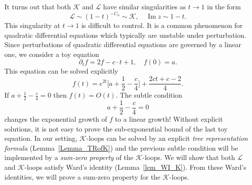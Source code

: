 \documentclass[10pt,reqno]{article}
\DeclareMathOperator{\im}{{\mathrm{Im}}}
\theoremstyle{plain} %
\theoremstyle{remark}
\numberwithin{equation}{section}
\begin{document}
It turns out  that both $\mathcal K$ and $\mathcal L$ have similar singularities as $t \to 1$ in the form 
\[
\mathcal{L}  \sim 
\left( 1-t \right)^{-C_n} \sim {\mathcal K },    \quad \im z \sim 1-t.
\]
This singularity  at $t \to 1$ is  difficult to control.  It  is a common phenomenon for  quadratic differential equations which  typically  are  unstable under perturbation. Since perturbations of  quadratic differential equations are governed by a linear one, we consider a toy  equation
\[
\partial_t f = 2f - c \cdot t + 1, \quad f(0) = a.
\]
This equation can be solved  explicitly 
\[
f(t)= e^{2 t} \big [a  + \frac 1 2    - \frac c 4    \big ] + \frac  { 2 ct + c-2}  4.
\]
If $a  + \frac 1 2    -  \frac c 4   =0$  then \( f(t) = O(t) \).  The subtle condition 
\[
a  + \frac 1 2    -  \frac c 4   =0
\]
changes the exponential growth of $f$ to a linear growth!  Without explicit solutions, it is not easy to prove the sub-exponential bound of the last toy equation. In our setting,   \(\mathcal{K}\)-loops can be solved by an explicit  \emph{tree representation  formula} (Lemma~\ref{Lemma_TRofK}) and  the previous subtle condition will be implemented by a \emph{sum-zero property} of the \(\mathcal{K}\)-loops.   We will show that both \(\mathcal{L}\) and  \(\mathcal{K}\)-loops satisfy   Ward's identity  (Lemma~\ref{lem_WI_K}). From these  Ward's identities, 
we will prove a {sum-zero property} for the \(\mathcal{K}\)-loops. 
\end{document}
